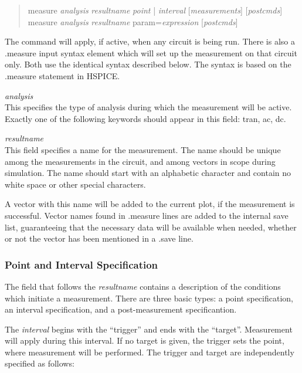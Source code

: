 \begin{quote}
measure {\it analysis} {\it resultname} {\it point} | {\it interval}
[{\it measurements\/}] [{\it postcmds\/}]\\
measure {\it analysis} {\it resultname} param={\it expression}
[{\it postcmds\/}]
\end{quote}

The command will apply, if active, when any circuit is being run. 
There is also a {\vt .measure} input syntax element which will set up
the measurement on that circuit only.  Both use the identical syntax
described below.  The syntax is based on the {\vt .measure} statement
in HSPICE.

\begin{description}
\item{\it analysis}\\
This specifies the type of analysis during which the measurement will
be active.  Exactly one of the following keywords should appear in
this field:  {\vt tran}, {\vt ac}, {\vt dc}.

\item{\it resultname}\\
This field specifies a name for the measurement.  The name should be
unique among the measurements in the circuit, and among vectors in
scope during simulation.  The name should start with an alphabetic
character and contain no white space or other special characters.
\end{description}

A vector with this name will be added to the current plot, if the
measurement is successful.  Vector names found in {\vt .measure} lines
are added to the internal save list, guaranteeing that the necessary
data will be available when needed, whether or not the vector has been
mentioned in a {\vt .save} line.

\subsubsection{Point and Interval Specification}

The field that follows the {\it resultname} contains a description of
the conditions which initiate a measurement.  There are three basic
types:  a point specification, an interval specification, and a
post-measurement specificantion.

The {\it interval} begins with the ``trigger'' and ends with the
``target''.  Measurement will apply during this interval.  If no
target is given, the trigger sets the {\vt point}, where measurement
will be performed.  The trigger and target are independently specified
as follows:

